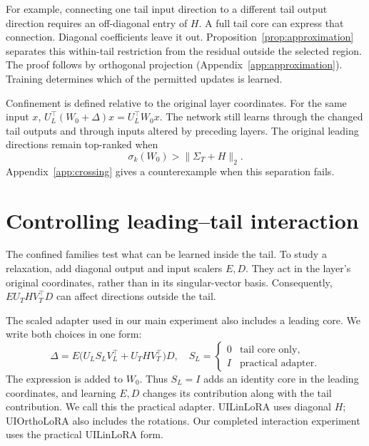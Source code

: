 \documentclass{article}
\begin{document}
For example, connecting one tail input direction to a different tail output direction requires an off-diagonal entry of $H$. A full tail core can express that connection. Diagonal coefficients leave it out. Proposition~\ref{prop:approximation} separates this within-tail restriction from the residual outside the selected region. The proof follows by orthogonal projection (Appendix~\ref{app:approximation}). Training determines which of the permitted updates is learned.

Confinement is defined relative to the original layer coordinates. For the same input $x$, $U_L^\top(W_0+\Delta)x=U_L^\top W_0x$. The network still learns through the changed tail outputs and through inputs altered by preceding layers. The original leading directions remain top-ranked when
\begin{equation}
\sigma_k(W_0)>\|\Sigma_T+H\|_2.
\label{eq:nocrossing}
\end{equation}
Appendix~\ref{app:crossing} gives a counterexample when this separation fails.

\section{Controlling leading--tail interaction}
\label{sec:mixing}

The confined families test what can be learned inside the tail. To study a relaxation, add diagonal output and input scalers $E,D$. They act in the layer's original coordinates, rather than in its singular-vector basis. Consequently, $EU_THV_T^\top D$ can affect directions outside the tail.

The scaled adapter used in our main experiment also includes a leading core. We write both choices in one form:
\begin{equation}
\Delta=E\bigl(U_LS_LV_L^\top+U_THV_T^\top\bigr)D,
\quad S_L=\begin{cases}0&\text{tail core only},\\I&\text{practical adapter}.
\end{cases}
\label{eq:unified}
\end{equation}
The expression is added to $W_0$. Thus $S_L=I$ adds an identity core in the leading coordinates, and learning $E,D$ changes its contribution along with the tail contribution. We call this the practical adapter. UILinLoRA uses diagonal $H$; UIOrthoLoRA also includes the rotations. Our completed interaction experiment uses the practical UILinLoRA form.
\end{document}
